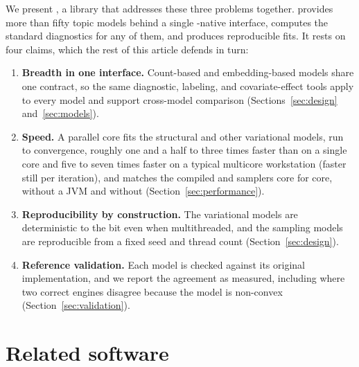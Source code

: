 \documentclass[article]{jss}
\begin{document}
We present , a  library that addresses these three
problems together.  provides more than fifty topic models behind a
single -native interface, computes the standard diagnostics for any of
them, and produces reproducible fits. It rests on four claims, which the rest of
this article defends in turn:

\begin{enumerate}
\item \textbf{Breadth in one interface.} Count-based and embedding-based models
share one contract, so the same diagnostic, labeling, and covariate-effect tools
apply to every model and support cross-model comparison
(Sections~\ref{sec:design} and~\ref{sec:models}).
\item \textbf{Speed.} A parallel  core fits the structural and
other variational models, run to convergence, roughly one and a half to three
times faster than   on a single core and five to seven times
faster on a typical multicore workstation (faster still per iteration), and matches
the compiled  and  samplers core for core, without a JVM and
without  (Section~\ref{sec:performance}).
\item \textbf{Reproducibility by construction.} The variational models are
deterministic to the bit even when multithreaded, and the sampling models are
reproducible from a fixed seed and thread count (Section~\ref{sec:design}).
\item \textbf{Reference validation.} Each model is checked against its original
implementation, and we report the agreement as measured, including where two correct
engines disagree because the model is non-convex (Section~\ref{sec:validation}).
\end{enumerate}

\section{Related software}\label{sec:related}
\end{document}
